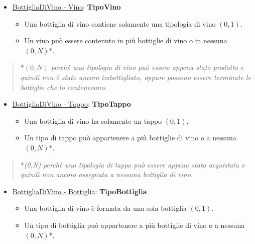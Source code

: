 \begin{itemize}
	\item \underline{BottigliaDiVino - Vino}: \textbf{TipoVino}
	
	\begin{itemize}
		\item Una bottiglia di vino contiene solamente una tipologia di vino $(0,1)$.
		\item Un vino può essere contenuto in più bottiglie di vino o in nessuna $(0,N)$*.
	\end{itemize}
	
\end{itemize}

\begin{verse}
	*\emph{$(0,N)$ perchè una tipologia di vino può essere appena stato prodotto e quindi non è stato ancora imbottigliato, oppure possono essere terminate le bottiglie che lo contenevano.}
\end{verse}

\begin{itemize}
	\item \underline{BottigliaDiVino - Tappo}: \textbf{TipoTappo}
	
	\begin{itemize}
		\item Una bottiglia di vino ha solamente un tappo $(0,1)$.
		\item Un tipo di tappo può appartenere a più bottiglie di vino o a nessuna $(0,N)$*.
	\end{itemize}
	
\end{itemize}

\begin{verse}
	*\emph{(0,N) perchè una tipologia di tappo può essere appena stata acquistata e quindi non ancora assegnata a nessuna bottiglia di vino.}
\end{verse}

\begin{itemize}
	\item \underline{BottigliaDiVino - Bottiglia}: \textbf{TipoBottiglia}
	
	\begin{itemize}
		\item Una bottiglia di vino è formata da una sola bottiglia $(0,1)$.
		\item Un tipo di bottiglia può appartenere a più bottiglie di vino o a nessuna $(0,N)$*.
	\end{itemize}
	
\end{itemize}

